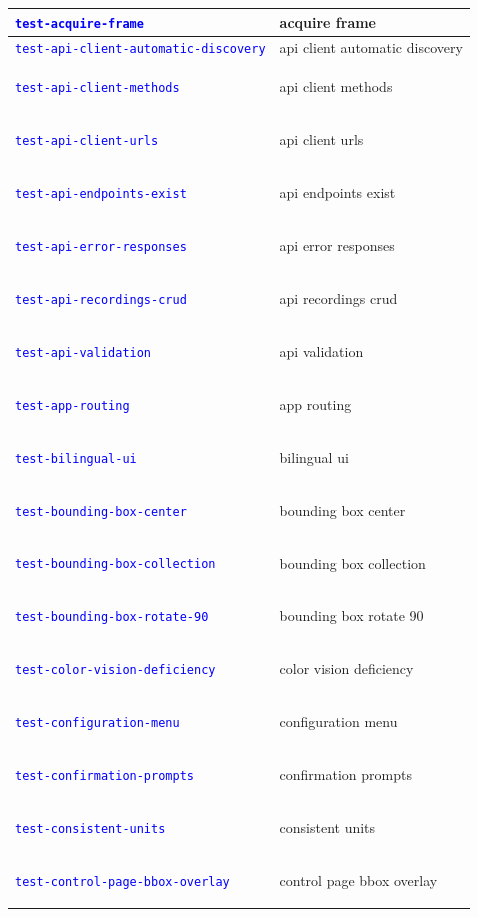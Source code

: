 \documentclass[12pt, titlepage]{article}
\newcommand{\tiddef}[1]{\hypertarget{tid:#1}{\textcolor{blue}{\texttt{#1}}}}
\begin{document}
\begin{longtable}{|>{\raggedright\arraybackslash}p{5cm}|>{\raggedright\arraybackslash}p{9cm}|}
  \tiddef{test-acquire-frame}                          & acquire frame                          \\ \hline
  \tiddef{test-api-client-automatic-discovery}         & api client automatic discovery         \\ \hline
  \tiddef{test-api-client-methods}                     & api client methods                     \\ \hline
  \tiddef{test-api-client-urls}                        & api client urls                        \\ \hline
  \tiddef{test-api-endpoints-exist}                    & api endpoints exist                    \\ \hline
  \tiddef{test-api-error-responses}                    & api error responses                    \\ \hline
  \tiddef{test-api-recordings-crud}                    & api recordings crud                    \\ \hline
  \tiddef{test-api-validation}                         & api validation                         \\ \hline
  \tiddef{test-app-routing}                            & app routing                            \\ \hline
  \tiddef{test-bilingual-ui}                           & bilingual ui                           \\ \hline
  \tiddef{test-bounding-box-center}                    & bounding box center                    \\ \hline
  \tiddef{test-bounding-box-collection}                & bounding box collection                \\ \hline
  \tiddef{test-bounding-box-rotate-90}                 & bounding box rotate 90                 \\ \hline
  \tiddef{test-color-vision-deficiency}                & color vision deficiency                \\ \hline
  \tiddef{test-configuration-menu}                     & configuration menu                     \\ \hline
  \tiddef{test-confirmation-prompts}                   & confirmation prompts                   \\ \hline
  \tiddef{test-consistent-units}                       & consistent units                       \\ \hline
  \tiddef{test-control-page-bbox-overlay}              & control page bbox overlay              \\ \hline

\end{longtable}
\end{document}
